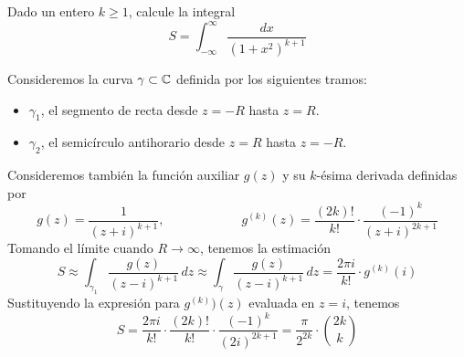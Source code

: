 \begin{exercise}
Dado un entero $k \ge 1$, calcule la integral
$$S = \int_{-\infty}^\infty \frac {dx} {(1 + x^2)^{k+1}}$$
\end{exercise}

\begin{solution}
Consideremos la curva $\gamma \subset \mathbb C$ definida por los siguientes tramos:
\begin{itemize}
    \item $\gamma_1$, el segmento de recta desde $z = -R$ hasta $z = R$.
    \item $\gamma_2$, el semicírculo antihorario desde $z = R$ hasta $z = -R$.
\end{itemize}
Consideremos también la función auxiliar $g(z)$ y su $k$-ésima derivada definidas por
$$
g(z) = \frac 1 {(z+i)^{k+1}}, \qquad \qquad \qquad
g^{(k)}(z) = \frac {(2k)!} {k!} \cdot \frac {(-1)^k} {(z+i)^{2k+1}}
$$
Tomando el límite cuando $R \to \infty$, tenemos la estimación
$$
S
    \approx \int_{\gamma_1} \frac {g(z)} {(z-i)^{k+1}} \, dz
    \approx \int_\gamma     \frac {g(z)} {(z-i)^{k+1}} \, dz
    = \frac {2\pi i} {k!} \cdot g^{(k)}(i)
$$
Sustituyendo la expresión para $g^{(k)})(z)$ evaluada en $z = i$, tenemos
$$
S
    = \frac {2\pi i} {k!} \cdot \frac {(2k)!} {k!} \cdot \frac {(-1)^k} {(2i)^{2k+1}}
    = \frac \pi {2^{2k}} \cdot \binom {2k} k
$$
\end{solution}
